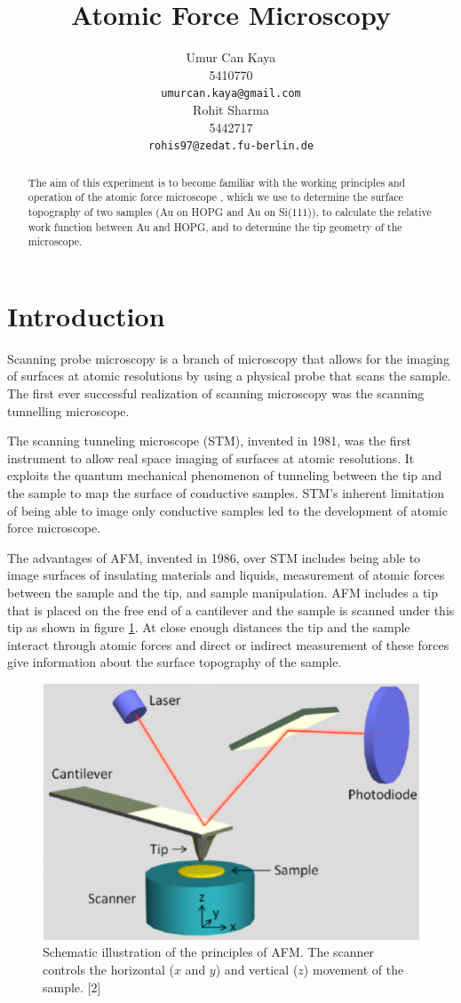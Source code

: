 \documentclass{article}
\title{Atomic Force Microscopy}
\author{
Umur Can Kaya\\
5410770\\
\texttt{umurcan.kaya@gmail.com}\\
\And
Rohit Sharma\\
5442717\\
\texttt{rohis97@zedat.fu-berlin.de}\\
}
\begin{document}
\maketitle

\begin{abstract}
The aim of this experiment is to become familiar with the working principles and operation of the atomic force microscope , which we use to determine the surface topography of two samples (Au on HOPG and Au on Si(111)), to calculate the relative work function between Au and HOPG, and to determine the tip geometry of the microscope.
\end{abstract}
\section{Introduction}

Scanning probe microscopy is a branch of microscopy that allows for the imaging of surfaces at atomic resolutions by using a physical probe that scans the sample. The first ever successful realization of scanning microscopy was the scanning tunnelling microscope.

The scanning tunneling microscope (STM), invented in 1981, was the first instrument to allow real space imaging of surfaces at atomic resolutions. It exploits the quantum mechanical phenomenon of tunneling between the tip and the sample to map the surface of conductive samples. STM's inherent limitation of being able to image only conductive samples led to the development of atomic force microscope.

The advantages of AFM, invented in 1986, over STM includes being able to image surfaces of insulating materials and liquids, measurement of atomic forces between the sample and the tip, and sample manipulation. AFM includes a tip that is placed on the free end of a cantilever and the sample is scanned under this tip as shown in figure \ref{fig:schematic_afm}. At close enough distances the tip and the sample interact through atomic forces and direct or indirect measurement of these forces give information about the surface topography of the sample.

\begin{figure}[h!]
\centering
\includegraphics[width=0.6\linewidth]{LAB/AFM/Schematic-AFM.png}
\caption{Schematic illustration of the principles of AFM. The scanner controls the horizontal ($x$ and $y$) and vertical ($z$) movement of the sample. [2]}
\label{fig:schematic_afm}
\end{figure}
\end{document}
